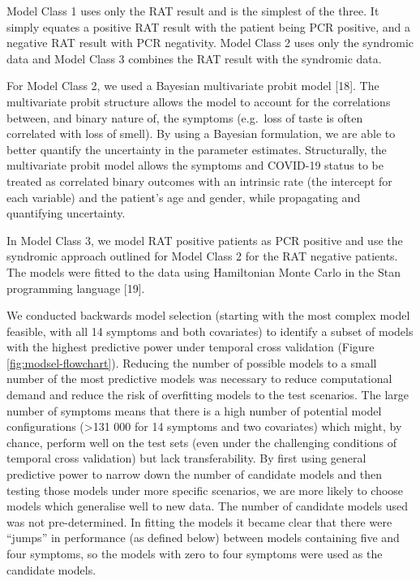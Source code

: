 \documentclass[]{elsarticle} %
\begin{document}
Model Class 1 uses only the RAT result and is the simplest of the three.
It simply equates a positive RAT result with the patient being PCR positive, and a negative RAT result with PCR negativity.
Model Class 2 uses only the syndromic data and Model Class 3 combines the RAT result with the syndromic data.

For Model Class 2, we used a Bayesian multivariate probit model {[}18{]}.
The multivariate probit structure allows the model to account for the correlations between, and binary nature of, the symptoms (e.g.~loss of taste is often correlated with loss of smell).
By using a Bayesian formulation, we are able to better quantify the uncertainty in the parameter estimates.
Structurally, the multivariate probit model allows the symptoms and COVID-19 status to be treated as correlated binary outcomes with an intrinsic rate (the intercept for each variable) and the patient's age and gender, while propagating and quantifying uncertainty.

In Model Class 3, we model RAT positive patients as PCR positive and use the syndromic approach outlined for Model Class 2 for the RAT negative patients.
The models were fitted to the data using Hamiltonian Monte Carlo in the Stan programming language {[}19{]}.

We conducted backwards model selection (starting with the most complex model feasible, with all 14 symptoms and both covariates) to identify a subset of models with the highest predictive power under temporal cross validation (Figure \ref{fig:modsel-flowchart}).
Reducing the number of possible models to a small number of the most predictive models was necessary to reduce computational demand and reduce the risk of overfitting models to the test scenarios.
The large number of symptoms means that there is a high number of potential model configurations (\textgreater131 000 for 14 symptoms and two covariates) which might, by chance, perform well on the test sets (even under the challenging conditions of temporal cross validation) but lack transferability.
By first using general predictive power to narrow down the number of candidate models and then testing those models under more specific scenarios, we are more likely to choose models which generalise well to new data.
The number of candidate models used was not pre-determined.
In fitting the models it became clear that there were ``jumps'' in performance (as defined below) between models containing five and four symptoms, so the models with zero to four symptoms were used as the candidate models.
\end{document}
